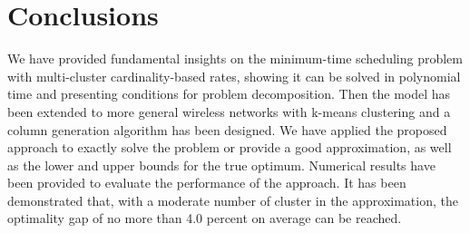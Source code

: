 \documentclass[10pt,onecolumn,journal,draftcls,oneside]{IEEEtran}
\newcounter{cond}
\begin{document}
\section{Conclusions}
\label{sec:conclusion}

We have provided fundamental insights on the minimum-time scheduling problem with multi-cluster cardinality-based rates, showing it can be solved in polynomial time and presenting conditions for problem decomposition. Then the model has been extended to more general wireless networks with k-means clustering and a column generation algorithm has been designed. We have applied the proposed approach to exactly solve the problem or provide a good approximation, as well as the lower and upper bounds for the true optimum. Numerical results have been provided to evaluate the performance of the approach. It has been demonstrated that, with a moderate number of cluster in the approximation, the optimality gap of no more than 4.0 percent on average can be reached. 
\end{document}

